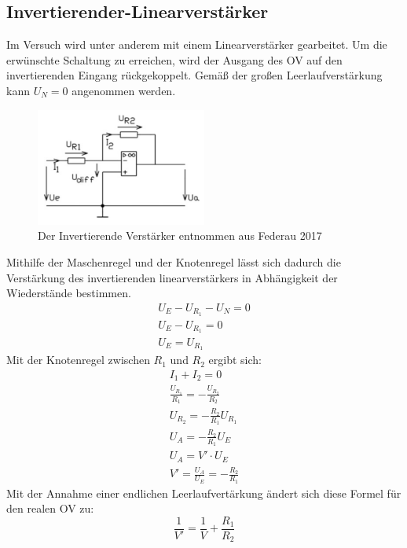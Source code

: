     \subsection{Invertierender-Linearverstärker}
        Im Versuch wird unter anderem mit einem Linearverstärker gearbeitet.
        Um die erwünschte Schaltung zu erreichen, wird der Ausgang des OV auf den invertierenden Eingang rückgekoppelt.
        Gemäß der großen Leerlaufverstärkung kann $U_N = 0$ angenommen werden.
        \begin{figure}[ht]
            \centering
            \includegraphics[width = 0.5\textwidth]{bilder/invertierender_verstaerker.png}
            \caption{Der Invertierende Verstärker entnommen aus Federau 2017}
            \label{fig:inv_Ver}
        \end{figure}
        Mithilfe der Maschenregel und der Knotenregel lässt sich dadurch die Verstärkung des invertierenden linearverstärkers in Abhängigkeit der Wiederstände bestimmen.
        \begin{align}
            U_E -U_{R_1}-U_N = 0\\
            U_E -U_{R_1} = 0\\
            U_E = U_{R_1}
        \end{align}
        Mit der Knotenregel zwischen $R_1$ und $R_2$ ergibt sich:
        \begin{align}
            I_1+I_2 = 0\\
            \frac{U_{R_1}}{R_1} = -\frac{U_{R_2}}{R_2}\\
            U_{R_2} = -\frac{R_2}{R_1} U_{R_1}\\
            U_{A} = -\frac{R_2}{R_1} U_{E}\\
            U_{A} = V' \cdot U_{E}\\
            V' = \frac{U_A}{U_E} = -\frac{R_2}{R_1}
        \end{align}
        Mit der Annahme einer endlichen Leerlaufvertärkung ändert sich diese Formel für den realen OV zu:
        \begin{equation*}
            \frac{1}{V'}= \frac{1}{V} +\frac{R_1}{R_2}
        \end{equation*}

